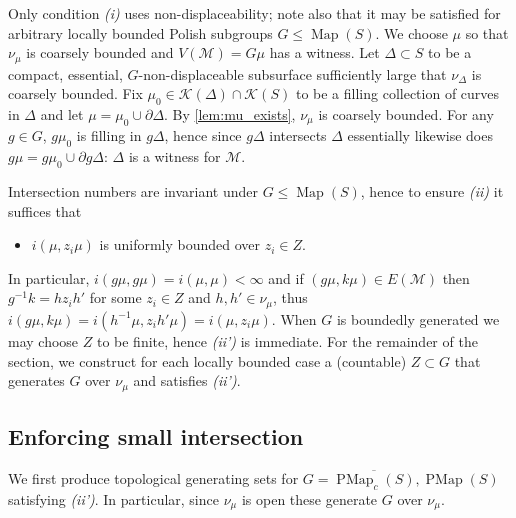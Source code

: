 \documentclass[twoside]{amsart}
\theoremstyle{plain}
\theoremstyle{break}
\theoremstyle{definition}
\theoremstyle{remark}
\newtheorem{remark*}[theorem]{Remark}
\DeclareMathOperator{\Map}{Map}
\newcommand{\M}{\mathcal M}
\DeclareMathOperator{\PMap}{PMap}
\begin{document}
Only condition \textit{(i)} uses non-displaceability; note also that it may be
satisfied for arbitrary locally bounded Polish subgroups $G \leq
\Map(S)$.  
We choose $\mu$ so that $\nu_\mu$ is coarsely bounded and
$V(\M) = G  \mu$
has a witness. Let
$\Delta \subset S$ to be a compact, essential, $G$-non-displaceable
subsurface sufficiently large that $\nu_\Delta$ is coarsely bounded.
Fix $\mu_0 \in \mathcal{K}(\Delta) \cap \mathcal{K}(S)$ to be a filling
collection of curves in $\Delta$ and let $\mu = \mu_0 \cup \partial
\Delta$.  By \cref{lem:mu_exists},
$\nu_\mu$ is coarsely bounded. For any $g \in
G$, $g \mu_0$ is
filling in $g \Delta$, hence since $g \Delta$ intersects
$\Delta$ essentially likewise does $g \mu = g\mu_0 \cup \partial
g\Delta$: $\Delta$ is a
witness for $\M$.

Intersection numbers are invariant under $G \leq \Map(S)$, hence to
ensure \textit{(ii)} it suffices that
\begin{itemize}
  \item[\textit{(ii')}]
$i(\mu, z_i\mu)$ is uniformly bounded over $z_i \in Z$.
\end{itemize}
In particular, $i(g
\mu,g \mu) = i(\mu,\mu) <\infty$ %
and if $(g\mu,k\mu) \in E(\M)$ then $g^{-1}k =  hz_ih'$ for
some $z_i \in Z$ and $h,h' \in \nu_\mu$, thus $i(g\mu,k\mu) =
i(h^{-1}\mu,z_ih'\mu) = i(\mu,z_i\mu)$.  
When $G$ is
boundedly generated we may choose $Z$ to be finite, hence 
\textit{(ii')} is immediate.
For the remainder of the section, we construct for each locally bounded case 
a (countable) $Z\subset G$
 that generates $G$ over $\nu_\mu$ and
satisfies \textit{(ii')}.


\subsection{Enforcing small
intersection}\label{sec:sm_int_Z}

We first produce topological generating sets for
$G = \overline{\PMap_c(S)},\PMap(S)$ satisfying \textit{(ii')}.  In
particular, since $\nu_\mu$ is open these generate $G$ over $\nu_\mu$.
\end{document}
